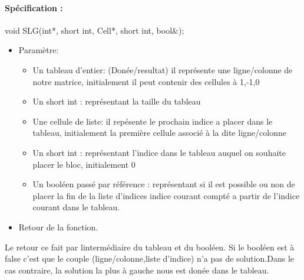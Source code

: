 \documentclass{article}
\begin{document}
\paragraph{Sp\'ecification :}
 void SLG(int*, short int, Cell*, short int, bool\&);
\begin{itemize}
\item Param\`etre:
\begin{itemize}
\item Un tableau d'entier: (Don\'ee/resultat) il repr\'esente une ligne/colonne de notre matrice, initialement il peut contenir des cellules \`a 1,-1,0
\item Un short int : repr\'esentant la taille du tableau
\item Une cellule de liste: il rep\'esente le prochain indice a placer dans le tableau, initialement la premi\`ere cellule associ\'e \`a la dite ligne/colonne
\item Un short int : repr\'esentant l'indice dans le tableau auquel on souhaite placer le bloc, initialement 0
\item Un bool\'een pass\'e par r\'ef\'erence : repr\'esentant si il est possible ou non de placer la fin de la liste d'indices indice courant compt\'e a partir de l'indice courant dans le tableau.
\end{itemize}
\item Retour de la fonction.
\end{itemize}
Le retour ce fait par linterm\'ediaire du tableau et du bool\'een. Si le bool\'een est \`a false c'est que le couple (ligne/colonne,liste d'indice) n'a pas de solution.Dans le cas contraire, la solution la plus \`a gauche nous est don\'ee dans le tableau.
\end{document}
